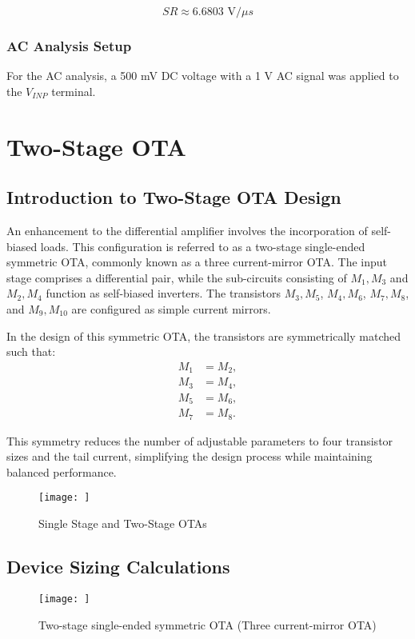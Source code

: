 \begin{equation}
    SR \approx 6.6803 \text{ V/} \mu s
\end{equation}

\subsubsection{AC Analysis Setup}
For the AC analysis, a 500 mV DC voltage with a 1 V AC signal was applied to the $V_{INP}$ terminal.

\section{Two-Stage OTA}

\subsection{Introduction to Two-Stage OTA Design}
An enhancement to the differential amplifier involves the incorporation of self-biased loads. This configuration is referred to as a two-stage single-ended symmetric OTA, commonly known as a three current-mirror OTA. The input stage comprises a differential pair, while the sub-circuits consisting of $M_1, M_3$ and $M_2, M_4$ function as self-biased inverters. The transistors $M_3, M_5$, $M_4, M_6$, $M_7, M_8$, and $M_9, M_{10}$ are configured as simple current mirrors.

In the design of this symmetric OTA, the transistors are symmetrically matched such that:
\begin{align*}
    M_1 &= M_2, \\
    M_3 &= M_4, \\
    M_5 &= M_6, \\
    M_7 &= M_8.
\end{align*}

This symmetry reduces the number of adjustable parameters to four transistor sizes and the tail current, simplifying the design process while maintaining balanced performance.

\begin{figure}[h]
    \centering
    \texttt{[image: ]} %
    \caption{Single Stage and Two-Stage OTAs}
    \label{fig:single_two_stage_ota}
\end{figure}

\subsection{Device Sizing Calculations}
\begin{figure}[h]
    \centering
    \texttt{[image: ]} %
    \caption{Two-stage single-ended symmetric OTA (Three current-mirror OTA)}
    \label{fig:two_stage_ota}
\end{figure}

